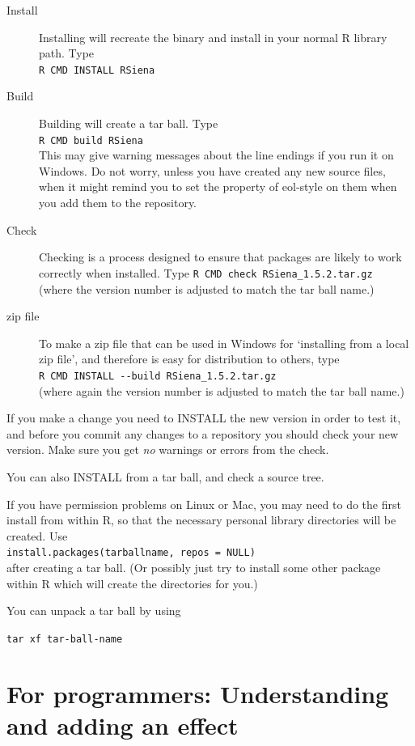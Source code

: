 \documentclass[a4paper,fleqn,11pt]{article}
\newcommand{\+}{\, + \,}
\begin{document}
\begin{description}
\item[Install] Installing will recreate the binary and install in your normal R
  library path. Type\\
\verb|R CMD INSTALL RSiena|
\item[Build] Building will create a tar ball. Type\\
\verb|R CMD build RSiena|\\
This may give warning messages about the line endings if you run it on
Windows. Do not worry, unless you have created any new source files, when it
might remind you to set the property of \textsf{eol-style} on them when you add
them to the repository.
\item [Check] Checking is a process designed to ensure that packages are likely
  to work correctly when installed. Type
\verb|R CMD check RSiena_1.5.2.tar.gz|\\
(where the version number is adjusted to match the tar ball name.)
\item[zip file] To make a zip file that can be used in Windows for
`installing from a local zip file', and therefore is easy for distribution
to others, type\\
\verb|R CMD INSTALL --build RSiena_1.5.2.tar.gz| \\
(where again the version number is adjusted to match the tar ball name.)
\end{description}

If you make a change you need to \textsf{INSTALL} the new version in order to
test it, and before you commit any changes to a repository you should
\textsf{check} your new version. Make sure you get \emph{no} warnings or
errors from the check.

You can also \textsf{INSTALL} from a tar ball, and \textsf{check} a source
tree.

If you have permission problems on Linux or Mac, you may need to do the first
install from within \textsf{R}, so that the necessary personal library
directories will be created. Use\\
\verb|install.packages(tarballname, repos = NULL)| \\after creating a tar
ball. (Or possibly just try to install some other package within R which will
create the directories for you.)

You can unpack a tar ball by using

\verb|tar xf tar-ball-name|

\section{For programmers: Understanding and adding an effect}
\end{document}

